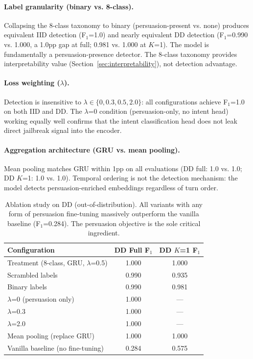 \documentclass[11pt,a4paper]{article}
\newcommand{\fone}{F$_1$}
\begin{document}
\paragraph{Label granularity (binary vs. 8-class).}
Collapsing the 8-class taxonomy to binary (persuasion-present vs. none) produces equivalent IID detection (\fone{}=1.0) and nearly equivalent DD detection (\fone{}=0.990 vs. 1.000, a 1.0pp gap at full; 0.981 vs. 1.000 at $K$=1).
The model is fundamentally a persuasion-presence detector.
The 8-class taxonomy provides interpretability value (Section~\ref{sec:interpretability}), not detection advantage.

\paragraph{Loss weighting ($\lambda$).}
Detection is insensitive to $\lambda \in \{0, 0.3, 0.5, 2.0\}$: all configurations achieve \fone{}=1.0 on both IID and DD.
The $\lambda$=0 condition (persuasion-only, no intent head) working equally well confirms that the intent classification head does not leak direct jailbreak signal into the encoder.

\paragraph{Aggregation architecture (GRU vs. mean pooling).}
Mean pooling matches GRU within 1pp on all evaluations (DD full: 1.0 vs. 1.0; DD $K$=1: 1.0 vs. 1.0).
Temporal ordering is not the detection mechanism: the model detects persuasion-enriched embeddings regardless of turn order.

\begin{table}[t]
\centering
\caption{Ablation study on DD (out-of-distribution). All variants with any form of persuasion fine-tuning massively outperform the vanilla baseline (\fone{}=0.284). The persuasion objective is the sole critical ingredient.}
\label{tab:ablation}
\begin{tabular}{lcc}
\toprule
Configuration & DD Full \fone{} & DD $K$=1 \fone{} \\
\midrule
Treatment (8-class, GRU, $\lambda$=0.5) & 1.000 & 1.000 \\
Scrambled labels & 0.990 & 0.935 \\
Binary labels & 0.990 & 0.981 \\
$\lambda$=0 (persuasion only) & 1.000 & --- \\
$\lambda$=0.3 & 1.000 & --- \\
$\lambda$=2.0 & 1.000 & --- \\
Mean pooling (replace GRU) & 1.000 & 1.000 \\
\midrule
Vanilla baseline (no fine-tuning) & 0.284 & 0.575 \\
\bottomrule
\end{tabular}
\end{table}
\end{document}
